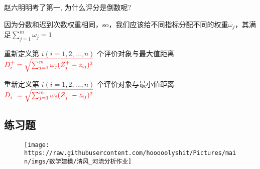 \documentclass[
]{article}
\begin{document}
赵六明明考了第一, 为什么评分是倒数呢?

因为分数和迟到次数权重相同，so，我们应该给不同指标分配不同的权重\(\omega_j\)，其满足\(\sum_{j=1}^m\omega_j = 1\)

重新定义第 \(i(i=1,2,...,n)\) 个评价对象与最大值距离
\(\textcolor{red}{D_i^+ = \sqrt{\sum_{j=1}^m \omega_j(Z_{j}^+ - z_{ij})^2}}\)

重新定义第 \(i(i=1,2,...,n)\) 个评价对象与最小值距离
\(\textcolor{red}{D_i^- = \sqrt{\sum_{j=1}^m \omega_j(Z_{j}^- - z_{ij})^2}}\)

\hypertarget{ux7ec3ux4e60ux9898}{%
\subsection{练习题}\label{ux7ec3ux4e60ux9898}}

\begin{figure}
\centering
\texttt{[image: https://raw.githubusercontent.com/hooooolyshit/Pictures/main/imgs/数学建模/清风\_河流分析作业]}
\caption{}
\end{figure}
\end{document}
